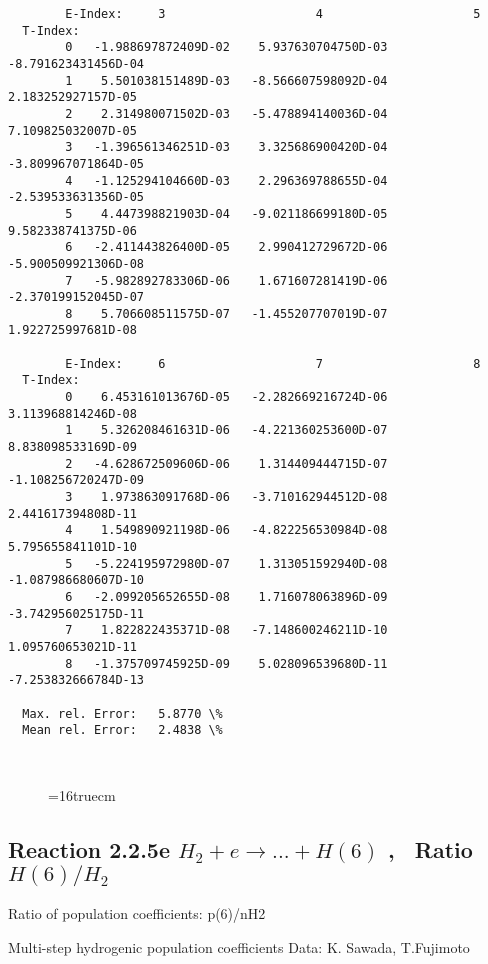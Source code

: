 \documentclass[12pt,dvipdfmx]{article}
\begin{document}
{\begin{small}
\begin{verbatim}
        E-Index:     3                     4                     5
  T-Index:
        0   -1.988697872409D-02    5.937630704750D-03   -8.791623431456D-04
        1    5.501038151489D-03   -8.566607598092D-04    2.183252927157D-05
        2    2.314980071502D-03   -5.478894140036D-04    7.109825032007D-05
        3   -1.396561346251D-03    3.325686900420D-04   -3.809967071864D-05
        4   -1.125294104660D-03    2.296369788655D-04   -2.539533631356D-05
        5    4.447398821903D-04   -9.021186699180D-05    9.582338741375D-06
        6   -2.411443826400D-05    2.990412729672D-06   -5.900509921306D-08
        7   -5.982892783306D-06    1.671607281419D-06   -2.370199152045D-07
        8    5.706608511575D-07   -1.455207707019D-07    1.922725997681D-08

        E-Index:     6                     7                     8
  T-Index:
        0    6.453161013676D-05   -2.282669216724D-06    3.113968814246D-08
        1    5.326208461631D-06   -4.221360253600D-07    8.838098533169D-09
        2   -4.628672509606D-06    1.314409444715D-07   -1.108256720247D-09
        3    1.973863091768D-06   -3.710162944512D-08    2.441617394808D-11
        4    1.549890921198D-06   -4.822256530984D-08    5.795655841101D-10
        5   -5.224195972980D-07    1.313051592940D-08   -1.087986680607D-10
        6   -2.099205652655D-08    1.716078063896D-09   -3.742956025175D-11
        7    1.822822435371D-08   -7.148600246211D-10    1.095760653021D-11
        8   -1.375709745925D-09    5.028096539680D-11   -7.253832666784D-13

  Max. rel. Error:   5.8770 \%
  Mean rel. Error:   2.4838 \%



\end{verbatim}\end{small}
\begin{figure} \label{2.2.5d}
\epsfxsize=16truecm
\end{figure}

\newpage
\subsection{
Reaction 2.2.5e  $H_2 + e \rightarrow ...+ H(6) $  , \  Ratio $H(6)/H_2 $
}

 Ratio of population coefficients: p(6)/nH2

 Multi-step hydrogenic population coefficients
 Data: K. Sawada, T.Fujimoto \cite{kn:Sawada}


\begin{small}\begin{verbatim}



\end{verbatim}
\end{small}}
\end{document}

